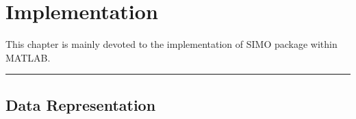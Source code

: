 \graphicspath{{./figures/chapter3/}}
\let\clearforchapter\par %
\chapter{Implementation}
This chapter is mainly devoted to the implementation of SIMO package within MATLAB.

\par\fancybreak{$***$}\par

\section{Data Representation}

